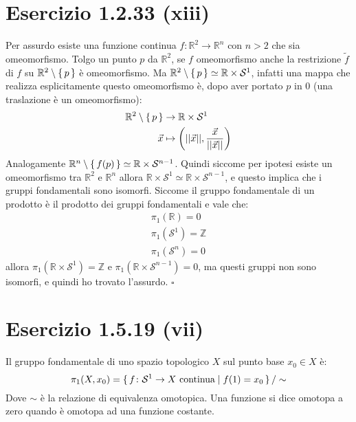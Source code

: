 \documentclass[10pt]{scrartcl}
\newcommand{\Z}{\mathbb{Z}}
\newcommand{\Sph}[1][]{\mathcal{S}^#1}
\begin{document}
\section*{Esercizio 1.2.33 (xiii)}
Per assurdo esiste una funzione continua $ f \colon \mathbb{R}^2 \to \mathbb{R}^n $
con $ n > 2 $ che sia omeomorfismo. Tolgo un punto $ p $ da $ \mathbb{R}^2 $,
se $ f $ omeomorfismo anche la restrizione $ \tilde{f} $ di $ f $ su
$ \mathbb{R}^2 \setminus \set{p} $ è omeomorfismo.
Ma  $ \mathbb{R}^{2} \setminus  \set{p} \simeq \mathbb{R} \times \mathcal{S}^1 $, infatti una mappa
che realizza esplicitamente questo omeomorfismo è, dopo aver portato $ p $ in $ 0 $
(una traslazione è un omeomorfismo):
\begin{align*}
  \mathbb{R}^{2} \setminus \set{p} & \to \mathbb{R} \times \mathcal{S}^1 \\
  \vec{x} & \mapsto \left( || \vec{x} ||, \frac{\vec{x}}{|| \vec{x} ||} \right)
\end{align*}
Analogamente $ \mathbb{R}^{n} \setminus \set{f(p)}  \simeq \mathbb{R} \times \Sph{n-1} $.
Quindi siccome per ipotesi esiste un omeomorfismo tra $ \mathbb{R}^{2} $ e
$ \mathbb{R}^{n} $ allora $ \mathbb{R} \times \Sph{1} \simeq \mathbb{R} \times \Sph{n-1} $,
e questo implica che i gruppi fondamentali sono isomorfi.
Siccome il gruppo fondamentale di un prodotto è il prodotto dei gruppi fondamentali
e vale che:
\begin{gather*}
  \pi_1(\mathbb{R}) = 0 \\
  \pi_1(\Sph{1}) = \Z \\
  \pi_1(\Sph{n}) = 0
\end{gather*}
allora $ \pi_1 (\mathbb{R} \times \Sph{1}) = \Z $ e $ \pi_1(\mathbb{R} \times \Sph{n-1}) = 0 $, ma
questi gruppi non sono isomorfi, e quindi ho trovato l'assurdo.
\hfill $ \square $



\section*{Esercizio 1.5.19 (vii)}
Il gruppo fondamentale di uno spazio topologico $ X $ sul punto base $ x_0 \in X $
è:
\[
  \pi_1(X,x_0) = \set{ f \colon \Sph{1} \to X \text{ continua} | f(1) = x_0 } \slash \sim
\]
Dove $ \sim $ è la relazione di equivalenza omotopica. Una funzione si dice
omotopa a zero quando è omotopa ad una funzione costante.
\end{document}
